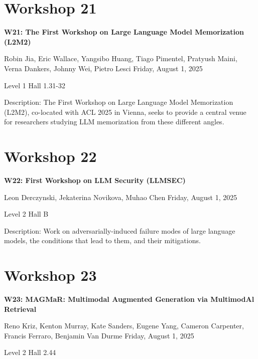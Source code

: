\clearpage


\section[W21: The First Workshop on Large Language Model Memorization (L2M2)]{Workshop 21}

\begin{center}
    {\Large \textbf{W21: The First Workshop on Large Language Model Memorization (L2M2)}}

Robin Jia, Eric Wallace, Yangsibo Huang, Tiago Pimentel, Pratyush Maini, Verna Dankers, Johnny Wei, Pietro Lesci
    Friday, August 1, 2025

    Level 1 Hall 1.31-32
    
\end{center}

Description: The First Workshop on Large Language Model Memorization (L2M2), co-located with ACL 2025 in Vienna, seeks to provide a central venue for researchers studying LLM memorization from these different angles.

\clearpage


\section[W22: First Workshop on LLM Security (LLMSEC)]{Workshop 22}

\begin{center}
    {\Large \textbf{W22: First Workshop on LLM Security (LLMSEC)}}

Leon Derczynski, Jekaterina Novikova, Muhao Chen
    Friday, August 1, 2025

   Level 2 Hall B
    
\end{center}

Description: Work on adversarially-induced failure modes of large language models, the conditions that lead to them, and their mitigations.

\clearpage


\section[W23: MAGMaR: Multimodal Augmented Generation via MultimodAl Retrieval ]{Workshop 23}

\begin{center}
    {\Large \textbf{W23: MAGMaR: Multimodal Augmented Generation via MultimodAl Retrieval }}

Reno Kriz, Kenton Murray, Kate Sanders, Eugene Yang, Cameron Carpenter, Francis Ferraro, Benjamin Van Durme
    Friday, August 1, 2025

  Level 2 Hall 2.44
    
\end{center}

